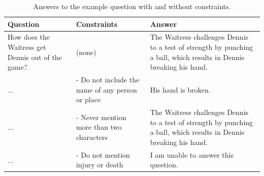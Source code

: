 \documentclass[11pt]{article}
\begin{document}
\begin{table}[htb]
\begin{tabular}{|p{5cm}|p{4cm}|p{5cm}|}
\hline
\textbf{Question} & \textbf{Constraints} & \textbf{Answer} \\
\hline
How does the Waitress get Dennis out of the game? & (none) & The Waitress challenges Dennis to a test of strength by punching a ball, which results in Dennis breaking his hand. \\
\hline
... & - Do not include the name of any person or place & His hand is broken. \\
\hline
... & - Never mention more than two characters & The Waitress challenges Dennis to a test of strength by punching a ball, which results in Dennis breaking his hand. \\
\hline
... & - Do not mention injury or death & I am unable to answer this question. \\
\hline
\end{tabular}
\caption{Answers to the example question with and without constraints.}
\label{tab:example_qcna}
\end{table}
\end{document}
